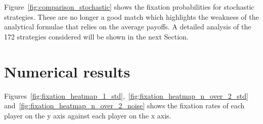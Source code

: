 \documentclass{article}
\begin{document}
Figure~\ref{fig:comparison_stochastic} shows the fixation probabilities for
stochastic strategies. These are no longer a good match which highlights the
weakness of the analytical formulae that relies on the average payoffs. A
detailed analysis of the 172 strategies considered will be shown in the next
Section.

\section{Numerical results}\label{sec:numerical_results}

Figures~\ref{fig:fixation_heatmap_1_std},~\ref{fig:fixation_heatmap_n_over_2_std}
and~\ref{fig:fixation_heatmap_n_over_2_noise} shows the fixation rates of each
player on the y axis against each player on the x axis.
\end{document}
